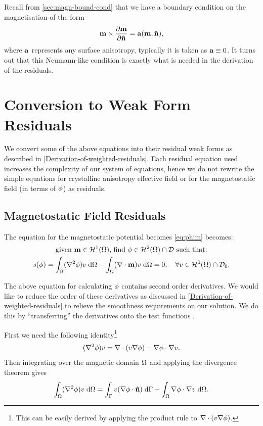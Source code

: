 Recall from \autoref{sec:magn-bound-cond} that we have a boundary condition on the magnetisation of the form
\begin{equation}
  \label{eq:m-bc}
  \mathbf{m} \times \frac{\partial \mathbf{m}}{\partial \mathbf{\hat{n}}} = {\mathbf{a}}(\mathbf{m}, \mathbf{\hat{n}}),
\end{equation}
where ${\mathbf{a}}$ represents any surface anisotropy, typically it is taken as ${\mathbf{a}} \equiv 0$.
It turns out that this Neumann-like condition is exactly what is needed in the derivation of the residuals.


\section{Conversion to Weak Form Residuals}

We convert some of the above equations into their residual weak forms as described in \autoref{Derivation-of-weighted-residuals}.
Each residual equation used increases the complexity of our system of equations, hence we do not rewrite the simple equations for crystalline anisotropy effective field or for the magnetostatic field (in terms of $\phi$) as residuals.


\subsection{Magnetostatic Field Residuals}
\label{sec:magn-field-resid}

The equation for the magnetostatic potential becomes \eqref{eq:phim} becomes:
\begin{gather}
  \text{given $\mathbf{m} \in \mathcal{H}^1(\Omega)$, find $\phi \in \mathcal{H}^2(\Omega) \cap \mathcal{D}$ such that:} \notag \\
  s(\phi) = \int_\Omega (\nabla^2 \phi) v  {\; \text{d}} \Omega
  - \int_\Omega (\nabla \cdot \mathbf{m}) v {\; \text{d}} \Omega = 0,
  \quad \forall v \in \mathcal{H}^0(\Omega) \cap \mathcal{D}_0. \label{eqn:phires1}
\end{gather}

The above equation for calculating $\phi$ contains second order derivatives.
We would like to reduce the order of these derivatives as discussed in \autoref{Derivation-of-weighted-residuals} to relieve the smoothness requirements on our solution.
We do this by ``transferring'' the derivatives onto the test functions \cite{HowardElmanDavidSilvester2006}.

First we need the following identity\footnote{This can be easily derived by applying the product rule to $\nabla \cdot (v \nabla \phi)$.}
\begin{equation}
  (\nabla^2 \phi) v =
  \nabla \cdot (v \nabla \phi)
  - \nabla \phi \cdot \nabla v.
  \label{eq:20}
\end{equation}
Then integrating over the magnetic domain $\Omega$ and applying the divergence theorem gives
\begin{equation}
  \int_\Omega (\nabla^2 \phi) v {\; \text{d}} \Omega =
  \int_{{\Gamma}} v (\nabla \phi \cdot \mathbf{\hat{n}}) {\; \text{d}} {\Gamma}
  - \int_\Omega \nabla \phi \cdot \nabla v {\; \text{d}} \Omega.
  \label{eqn:identitygauss}
\end{equation}

